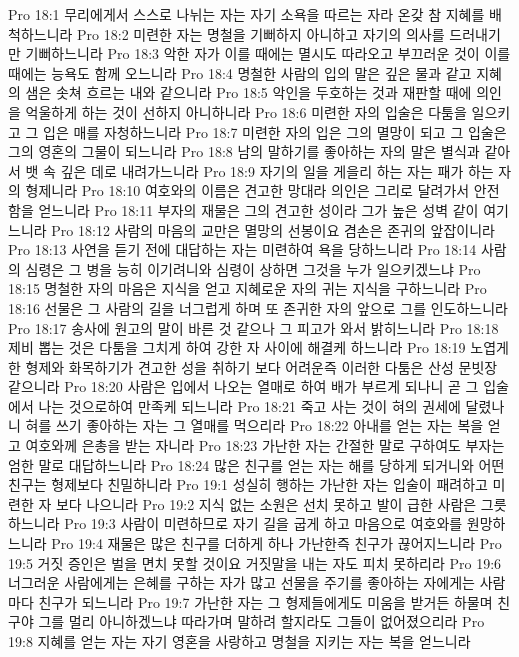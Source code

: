 Pro 18:1  무리에게서 스스로 나뉘는 자는 자기 소욕을 따르는 자라 온갖 참 지혜를 배척하느니라
Pro 18:2  미련한 자는 명철을 기뻐하지 아니하고 자기의 의사를 드러내기만 기뻐하느니라
Pro 18:3  악한 자가 이를 때에는 멸시도 따라오고 부끄러운 것이 이를 때에는 능욕도 함께 오느니라
Pro 18:4  명철한 사람의 입의 말은 깊은 물과 같고 지혜의 샘은 솟쳐 흐르는 내와 같으니라
Pro 18:5  악인을 두호하는 것과 재판할 때에 의인을 억울하게 하는 것이 선하지 아니하니라
Pro 18:6  미련한 자의 입술은 다툼을 일으키고 그 입은 매를 자청하느니라
Pro 18:7  미련한 자의 입은 그의 멸망이 되고 그 입술은 그의 영혼의 그물이 되느니라
Pro 18:8  남의 말하기를 좋아하는 자의 말은 별식과 같아서 뱃 속 깊은 데로 내려가느니라
Pro 18:9  자기의 일을 게을리 하는 자는 패가 하는 자의 형제니라
Pro 18:10  여호와의 이름은 견고한 망대라 의인은 그리로 달려가서 안전함을 얻느니라
Pro 18:11  부자의 재물은 그의 견고한 성이라 그가 높은 성벽 같이 여기느니라
Pro 18:12  사람의 마음의 교만은 멸망의 선봉이요 겸손은 존귀의 앞잡이니라
Pro 18:13  사연을 듣기 전에 대답하는 자는 미련하여 욕을 당하느니라
Pro 18:14  사람의 심령은 그 병을 능히 이기려니와 심령이 상하면 그것을 누가 일으키겠느냐
Pro 18:15  명철한 자의 마음은 지식을 얻고 지혜로운 자의 귀는 지식을 구하느니라
Pro 18:16  선물은 그 사람의 길을 너그럽게 하며 또 존귀한 자의 앞으로 그를 인도하느니라
Pro 18:17  송사에 원고의 말이 바른 것 같으나 그 피고가 와서 밝히느니라
Pro 18:18  제비 뽑는 것은 다툼을 그치게 하여 강한 자 사이에 해결케 하느니라
Pro 18:19  노엽게 한 형제와 화목하기가 견고한 성을 취하기 보다 어려운즉 이러한 다툼은 산성 문빗장 같으니라
Pro 18:20  사람은 입에서 나오는 열매로 하여 배가 부르게 되나니 곧 그 입술에서 나는 것으로하여 만족케 되느니라
Pro 18:21  죽고 사는 것이 혀의 권세에 달렸나니 혀를 쓰기 좋아하는 자는 그 열매를 먹으리라
Pro 18:22  아내를 얻는 자는 복을 얻고 여호와께 은총을 받는 자니라
Pro 18:23  가난한 자는 간절한 말로 구하여도 부자는 엄한 말로 대답하느니라
Pro 18:24  많은 친구를 얻는 자는 해를 당하게 되거니와 어떤 친구는 형제보다 친밀하니라
Pro 19:1  성실히 행하는 가난한 자는 입술이 패려하고 미련한 자 보다 나으니라
Pro 19:2  지식 없는 소원은 선치 못하고 발이 급한 사람은 그릇하느니라
Pro 19:3  사람이 미련하므로 자기 길을 굽게 하고 마음으로 여호와를 원망하느니라
Pro 19:4  재물은 많은 친구를 더하게 하나 가난한즉 친구가 끊어지느니라
Pro 19:5  거짓 증인은 벌을 면치 못할 것이요 거짓말을 내는 자도 피치 못하리라
Pro 19:6  너그러운 사람에게는 은혜를 구하는 자가 많고 선물을 주기를 좋아하는 자에게는 사람마다 친구가 되느니라
Pro 19:7  가난한 자는 그 형제들에게도 미움을 받거든 하물며 친구야 그를 멀리 아니하겠느냐 따라가며 말하려 할지라도 그들이 없어졌으리라
Pro 19:8  지혜를 얻는 자는 자기 영혼을 사랑하고 명철을 지키는 자는 복을 얻느니라
